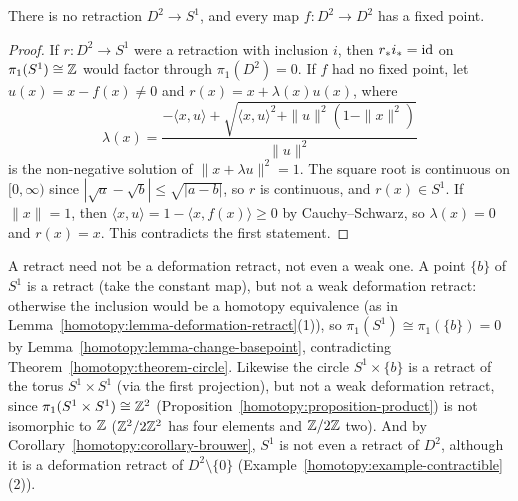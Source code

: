 \begin{corollary}\label{homotopy:corollary-brouwer}
There is no retraction $D^2 \to S^1$, and every map $f \colon D^2 \to D^2$ has a fixed point.
\end{corollary}

\begin{proof}
If $r \colon D^2 \to S^1$ were a retraction with inclusion $i$, then $r_*i_* = \mathrm{id}$ on $\pi_1(S^1) \cong \mathbb{Z}$ would factor through $\pi_1(D^2) = 0$. If $f$ had no fixed
point, let $u(x) = x - f(x) \neq 0$ and $r(x) = x + \lambda(x)u(x)$, where
\[
\lambda(x) = \frac{-\langle x, u \rangle + \sqrt{\langle x, u \rangle^2 + \|u\|^2(1 - \|x\|^2)}}{\|u\|^2}
\]
is the non-negative solution of $\|x + \lambda u\|^2 = 1$. The square root is continuous on $[0, \infty)$ since $|\sqrt{a} - \sqrt{b}| \leq \sqrt{|a - b|}$, so $r$
is continuous, and $r(x) \in S^1$. If $\|x\| = 1$, then $\langle x, u \rangle = 1 - \langle x, f(x) \rangle \geq 0$ by Cauchy--Schwarz, so $\lambda(x) = 0$ and
$r(x) = x$. This contradicts the first statement.
\end{proof}

\begin{counterexample}\label{homotopy:counterexample-retract-not-deformation}
A retract need not be a deformation retract, not even a weak one. A point $\{b\}$ of $S^1$ is a retract (take the constant map), but not a weak deformation
retract: otherwise the inclusion would be a homotopy equivalence (as in Lemma~\ref{homotopy:lemma-deformation-retract}(1)), so
$\pi_1(S^1) \cong \pi_1(\{b\}) = 0$ by Lemma~\ref{homotopy:lemma-change-basepoint}, contradicting Theorem~\ref{homotopy:theorem-circle}. Likewise the circle
$S^1 \times \{b\}$ is a retract of the torus $S^1 \times S^1$ (via the first projection), but not a weak deformation retract, since
$\pi_1(S^1 \times S^1) \cong \mathbb{Z}^2$ (Proposition~\ref{homotopy:proposition-product}) is not isomorphic to $\mathbb{Z}$ ($\mathbb{Z}^2/2\mathbb{Z}^2$ has four elements and
$\mathbb{Z}/2\mathbb{Z}$ two). And by Corollary~\ref{homotopy:corollary-brouwer}, $S^1$ is not even a retract of $D^2$, although it is a deformation retract of
$D^2 \setminus \{0\}$ (Example~\ref{homotopy:example-contractible}(2)).
\end{counterexample}

